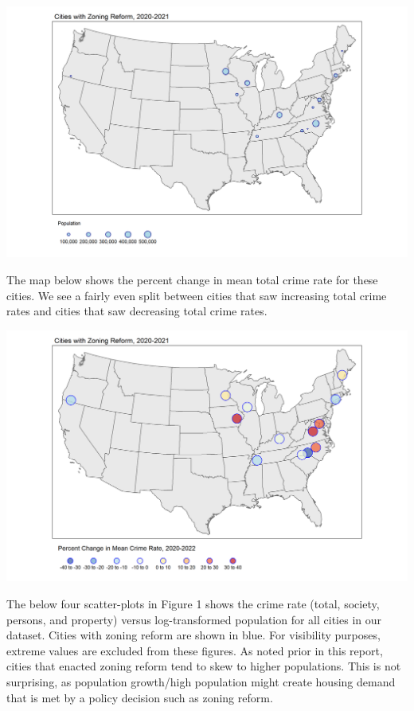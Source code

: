 \documentclass[
  12pt,
]{article}
\begin{document}
\includegraphics{Plots/Cities_pop.png}

The map below shows the percent change in mean total crime rate for
these cities. We see a fairly even split between cities that saw
increasing total crime rates and cities that saw decreasing total crime
rates.

\includegraphics{Plots/Cities_ratechange.png}

The below four scatter-plots in Figure 1 shows the crime rate (total,
society, persons, and property) versus log-transformed population for
all cities in our dataset. Cities with zoning reform are shown in blue.
For visibility purposes, extreme values are excluded from these figures.
As noted prior in this report, cities that enacted zoning reform tend to
skew to higher populations. This is not surprising, as population
growth/high population might create housing demand that is met by a
policy decision such as zoning reform.
\end{document}
